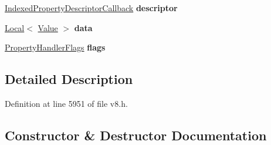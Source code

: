 \begin{DoxyCompactItemize}
\mbox{\hyperlink{namespacev8_a7506e91d70d885b5cbeabdf870ac0e88}{Indexed\+Property\+Descriptor\+Callback}} {\bfseries descriptor}
\item 
\mbox{\label{structv8_1_1IndexedPropertyHandlerConfiguration_abbedfb5f55042decce382b4482bd5bbc}} 
\mbox{\hyperlink{classv8_1_1Local}{Local}}$<$ \mbox{\hyperlink{classv8_1_1Value}{Value}} $>$ {\bfseries data}
\item 
\mbox{\label{structv8_1_1IndexedPropertyHandlerConfiguration_a435b9a3495ba031611bd7feea4cb981b}} 
\mbox{\hyperlink{namespacev8_af4789f0aeb8680e353901a35810cac1a}{Property\+Handler\+Flags}} {\bfseries flags}
\end{DoxyCompactItemize}


\subsection{Detailed Description}


Definition at line 5951 of file v8.\+h.



\subsection{Constructor \& Destructor Documentation}
\mbox{\label{structv8_1_1IndexedPropertyHandlerConfiguration_a2fb34a4a34c19fce4654c1e02151164b}} 
